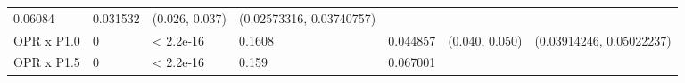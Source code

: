 \documentclass[
]{article}
\begin{document}
\begin{longtable}[]{@{}lllllll@{}}
\begin{minipage}[t]{0.12\columnwidth}
0.06084\strut
\end{minipage} & \begin{minipage}[t]{0.12\columnwidth}\raggedright
0.031532\strut
\end{minipage} & \begin{minipage}[t]{0.12\columnwidth}\raggedright
(0.026, 0.037)\strut
\end{minipage} & \begin{minipage}[t]{0.12\columnwidth}\raggedright
(0.02573316, 0.03740757)\strut
\end{minipage}\tabularnewline
\begin{minipage}[t]{0.12\columnwidth}\raggedright
OPR x P1.0\strut
\end{minipage} & \begin{minipage}[t]{0.12\columnwidth}\raggedright
0\strut
\end{minipage} & \begin{minipage}[t]{0.12\columnwidth}\raggedright
\textless{} 2.2e-16\strut
\end{minipage} & \begin{minipage}[t]{0.12\columnwidth}\raggedright
0.1608\strut
\end{minipage} & \begin{minipage}[t]{0.12\columnwidth}\raggedright
0.044857\strut
\end{minipage} & \begin{minipage}[t]{0.12\columnwidth}\raggedright
(0.040, 0.050)\strut
\end{minipage} & \begin{minipage}[t]{0.12\columnwidth}\raggedright
(0.03914246, 0.05022237)\strut
\end{minipage}\tabularnewline
\begin{minipage}[t]{0.12\columnwidth}\raggedright
OPR x P1.5\strut
\end{minipage} & \begin{minipage}[t]{0.12\columnwidth}\raggedright
0\strut
\end{minipage} & \begin{minipage}[t]{0.12\columnwidth}\raggedright
\textless{} 2.2e-16\strut
\end{minipage} & \begin{minipage}[t]{0.12\columnwidth}\raggedright
0.159\strut
\end{minipage} & \begin{minipage}[t]{0.12\columnwidth}\raggedright
0.067001\strut
\end{minipage} & \begin{minipage}[t]{0.12\columnwidth}\raggedright

\end{minipage}
\end{longtable}
\end{document}
